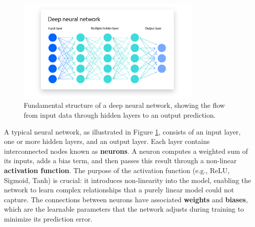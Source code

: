 \documentclass[16pt]{report}
\begin{document}
\begin{figure}[H]
    \centering
    \includegraphics[width=0.8\textwidth]{images/deep_learning-graph.png}
    \caption{Fundamental structure of a deep neural network, showing the flow from input data through hidden layers to an output prediction.}
    \label{fig:deep-learning-graph}
\end{figure}

A typical neural network, as illustrated in Figure \ref{fig:deep-learning-graph}, consists of an input layer, one or more hidden layers, and an output layer. Each layer contains interconnected nodes known as \textbf{neurons}. A neuron computes a weighted sum of its inputs, adds a bias term, and then passes this result through a non-linear \textbf{activation function}. The purpose of the activation function (e.g., ReLU, Sigmoid, Tanh) is crucial: it introduces non-linearity into the model, enabling the network to learn complex relationships that a purely linear model could not capture. The connections between neurons have associated \textbf{weights} and \textbf{biases}, which are the learnable parameters that the network adjusts during training to minimize its prediction error.
\end{document}
